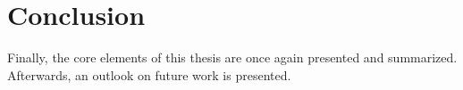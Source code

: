 
\chapter{Conclusion}\label{ord:ch6}

Finally, the core elements of this thesis are once again presented and summarized.
Afterwards, an outlook on future work is presented.

